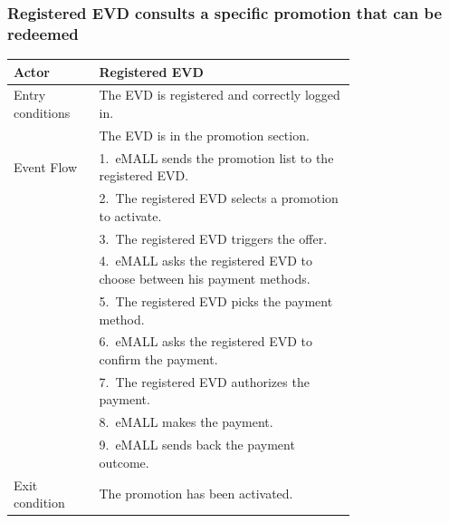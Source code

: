 \subsubsection*{Registered EVD consults a specific promotion that can be redeemed}
\begin{center}
    \begin{longtable}{lp{0.75\linewidth}}
        \hline
        Actor            & Registered EVD                                                                                                        \\
        \hline
        Entry conditions & The EVD is registered and correctly logged in.                                                                        \\
        & The EVD is in the promotion section.                                                                                  \\
        \hline
        Event Flow       & 1.\ eMALL sends the promotion list to the registered EVD.                                                             \\
        & 2.\ The registered EVD selects a promotion to activate.                                                               \\
        & 3.\ The registered EVD triggers the offer.                                                                            \\
        & 4.\ eMALL asks the registered EVD to choose between his payment methods.                                              \\
        & 5.\ The registered EVD picks the payment method.                                                                      \\
        & 6.\ eMALL asks the registered EVD to confirm the payment.                                                             \\
        & 7.\ The registered EVD authorizes the payment.                                                                        \\
        & 8.\ eMALL makes the payment.                                                                                          \\
        & 9.\ eMALL sends back the payment outcome.                                                                             \\
        \hline
        Exit condition   & The promotion has been activated.                                                                                     \\

\end{longtable}
\end{center}
